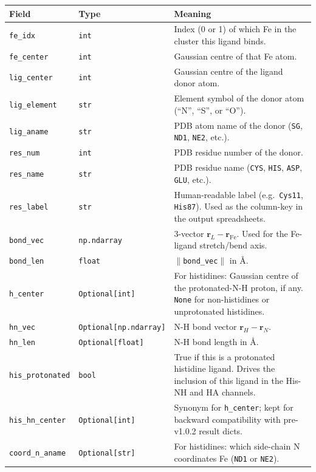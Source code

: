 \documentclass[10pt,a4paper,twoside]{article}
\newcommand{\rvec}{\mathbf{r}}
\begin{document}
\begin{longtable}{p{} p{} p{}}
\toprule
\textbf{Field} & \textbf{Type} & \textbf{Meaning} \\
\midrule
\texttt{fe\_idx} & \texttt{int}
  & Index (0 or 1) of which Fe in the cluster this ligand binds. \\
\texttt{fe\_center} & \texttt{int}
  & Gaussian centre of that Fe atom. \\
\texttt{lig\_center} & \texttt{int}
  & Gaussian centre of the ligand donor atom. \\
\texttt{lig\_element} & \texttt{str}
  & Element symbol of the donor atom (``N'', ``S'', or ``O''). \\
\texttt{lig\_aname} & \texttt{str}
  & PDB atom name of the donor (\texttt{SG}, \texttt{ND1},
    \texttt{NE2}, etc.). \\
\texttt{res\_num} & \texttt{int}
  & PDB residue number of the donor. \\
\texttt{res\_name} & \texttt{str}
  & PDB residue name (\texttt{CYS}, \texttt{HIS}, \texttt{ASP},
    \texttt{GLU}, etc.). \\
\texttt{res\_label} & \texttt{str}
  & Human-readable label (e.g.\ \texttt{Cys11}, \texttt{His87}).
    Used as the column-key in the output spreadsheets. \\
\texttt{bond\_vec} & \texttt{np.ndarray}
  & 3-vector $\rvec_L - \rvec_{\text{Fe}}$. Used for the
    Fe-ligand stretch/bend axis. \\
\texttt{bond\_len} & \texttt{float}
  & $\lVert$\texttt{bond\_vec}$\rVert$ in \AA{}. \\
\texttt{h\_center} & \texttt{Optional[int]}
  & For histidines: Gaussian centre of the protonated-N-H proton, if
    any. \texttt{None} for non-histidines or unprotonated histidines. \\
\texttt{hn\_vec} & \texttt{Optional[np.ndarray]}
  & N-H bond vector $\rvec_H - \rvec_N$. \\
\texttt{hn\_len} & \texttt{Optional[float]}
  & N-H bond length in \AA{}. \\
\texttt{his\_protonated} & \texttt{bool}
  & True if this is a protonated histidine ligand. Drives the
    inclusion of this ligand in the His-NH and HA channels. \\
\texttt{his\_hn\_center} & \texttt{Optional[int]}
  & Synonym for \texttt{h\_center}; kept for backward compatibility
    with pre-v1.0.2 result dicts. \\
\texttt{coord\_n\_aname} & \texttt{Optional[str]}
  & For histidines: which side-chain N coordinates Fe
    (\texttt{ND1} or \texttt{NE2}). \\
\bottomrule
\end{longtable}
\end{document}
